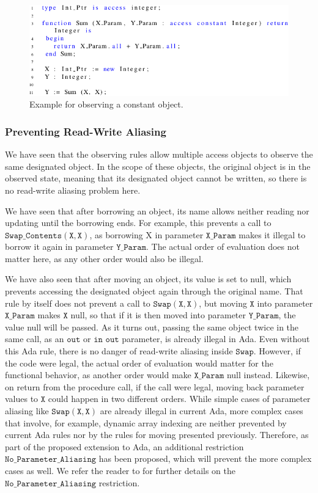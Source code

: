 \documentclass{llncs}
\newcommand\var[1]{\ensuremath{\mathtt{#1}}}
\begin{document}
\begin{figure}[htb!]
\centering
   \includegraphics[]{observe_ex1}
   \caption{Example for observing a constant object.}
   \label{fig:observe_exp}
\end{figure}

\subsubsection{Preventing Read-Write Aliasing}
\label{sec:noaliasing}

We have seen that the observing rules allow multiple access objects to observe the same designated object. In the scope of these objects, the original object is in the observed state, meaning that its designated object
cannot be written, so there is no read-write aliasing problem here.

\smallskip
We have seen that after borrowing an object, its name allows neither reading nor updating until the borrowing ends. For example, this prevents a call to \var{Swap\_Contents (X, X)},
as borrowing X in parameter \var{X\_Param} makes it illegal to borrow it again in parameter \var{Y\_Param}. The actual order of evaluation does not matter here, as any other order would also be illegal.

\smallskip
We have also seen that after moving an object, its value is set to null, which prevents accessing the designated object again through the original name.
That rule by itself does not prevent a call to \var{Swap(X, X)}, but moving \var{X} into parameter \var{X\_Param} makes \var{X} null, so that if it is then moved into parameter \var{Y\_Param}, the value null will be passed.   As it turns out, passing the same object twice in the same call, as an \var{out} or \var{in} \var{out} parameter, is already illegal in Ada.
Even without this Ada rule, there is no danger of read-write aliasing inside \var{Swap}. However, if the code were legal, the actual order of evaluation would matter for the functional behavior, as another order would make \var{X\_Param} null
instead. Likewise, on return from the procedure call, if the call were legal, moving back parameter values to \var{X} could happen in two different orders.
While simple cases of parameter aliasing like \var{Swap(X,X)} are already illegal in current Ada, more complex cases that involve, for example, dynamic array indexing are neither
prevented by current Ada rules nor by the rules for moving presented previously. Therefore, as part of the proposed
extension to Ada, an additional restriction \var{No\_Parameter\_Aliasing} has been proposed,
which will prevent the more complex cases as well. We refer the reader to \cite{AI2017} for further details on the \var{No\_Parameter\_Aliasing} restriction.
\end{document}
